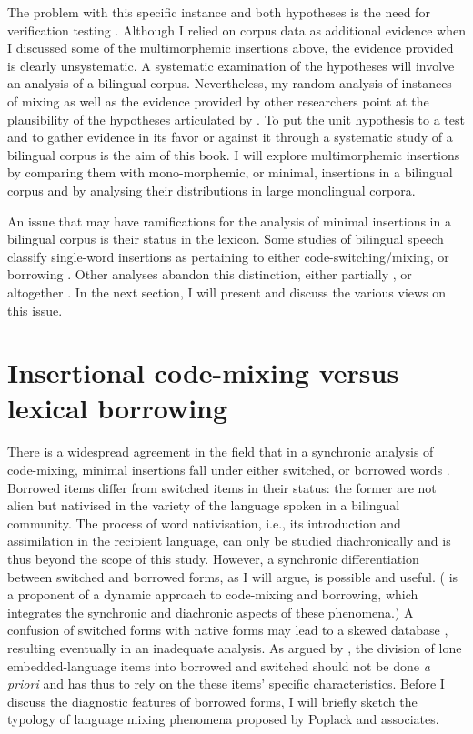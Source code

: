 The problem with this specific instance and both hypotheses is the need for verification testing \citep[cf.][42]{wray-2002}. Although I relied on corpus data as additional evidence when I discussed some of the multimorphemic insertions above, the evidence provided is clearly unsystematic. A systematic examination of the hypotheses will involve an analysis of a bilingual corpus. Nevertheless, my random analysis of instances of mixing as well as the evidence provided by other researchers point at the plausibility of the hypotheses articulated by \citet{backus-units-2003}. To put the unit hypothesis to a test and to gather evidence in its favor or against it through a systematic study of a bilingual corpus is the aim of this book. I will explore multimorphemic insertions by comparing them with mono-morphemic, or minimal, insertions in a bilingual corpus and by analysing their distributions in large monolingual corpora.

An issue that may have ramifications for the analysis of minimal insertions in a bilingual corpus is their status in the lexicon. Some studies of bilingual speech classify single-word insertions as pertaining to either code-switching/mixing, or borrowing \citep[e.g.,][]{poplack18}. Other analyses abandon this distinction, either partially \citep[e.g.,][78--81]{muysken-bilingual-2000}, or altogether \citep[e.g][]{backus-13,backus-cs-15}. In the next section, I will present and discuss the various views on this issue.

\section{Insertional code-mixing versus lexical borrowing}\label{CM-borrowing}

There is a widespread agreement in the field that in a synchronic analysis of code-mixing, minimal insertions fall under either switched, or borrowed words  \citep[e.g.,][]{haugen-1953-vol1,poplack-etal-1988, myers-scotton-duelling-1993,milroy-code-switching-1995,thomason-language-2001}. Borrowed items differ from switched items in their status: the former are not alien but nativised in the variety of the language spoken in a bilingual community. The process of word nativisation, i.e., its introduction and assimilation in the recipient language, can only be studied diachronically \citep[cf.][]{poplack-dion-2012} and is thus beyond the scope of this study. However, a synchronic differentiation between switched and borrowed forms, as I will argue, is possible and useful. (\citealt{backus-cs-15} is a proponent of a dynamic approach to code-mixing and borrowing, which integrates the synchronic and  diachronic aspects of these phenomena.) A confusion of switched forms with native forms may lead to a skewed database \citep[164]{myers-scotton-duelling-1993}, resulting eventually in an inadequate analysis. As argued by \citet{poplack-comment-2011}, the division of lone embedded-language items into borrowed and switched should not be done \textit{a priori} and has thus to rely on the these items' specific characteristics. Before I discuss the diagnostic features of borrowed forms, I will briefly sketch the typology of language mixing phenomena proposed by Poplack and associates. 

